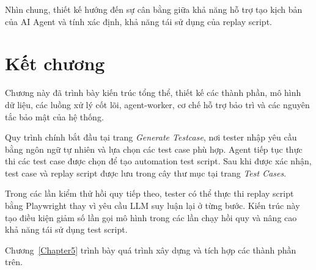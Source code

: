 Nhìn chung, thiết kế hướng đến sự cân bằng giữa khả năng hỗ trợ tạo kịch bản của AI Agent và tính xác định, khả năng tái sử dụng của replay script.

\section{Kết chương}

Chương này đã trình bày kiến trúc tổng thể, thiết kế các thành phần, mô hình dữ liệu, các luồng xử lý cốt lõi, agent-worker, cơ chế hỗ trợ bảo trì và các nguyên tắc bảo mật của hệ thống.

Quy trình chính bắt đầu tại trang \textit{Generate Testcase}, nơi tester nhập yêu cầu bằng ngôn ngữ tự nhiên và lựa chọn các test case phù hợp. Agent tiếp tục thực thi các test case được chọn để tạo automation test script. Sau khi được xác nhận, test case và replay script được lưu trong cây thư mục tại trang \textit{Test Cases}.

Trong các lần kiểm thử hồi quy tiếp theo, tester có thể thực thi replay script bằng Playwright thay vì yêu cầu LLM suy luận lại ở từng bước. Kiến trúc này tạo điều kiện giảm số lần gọi mô hình trong các lần chạy hồi quy và nâng cao khả năng tái sử dụng test script.

Chương~\ref{Chapter5} trình bày quá trình xây dựng và tích hợp các thành phần trên.
